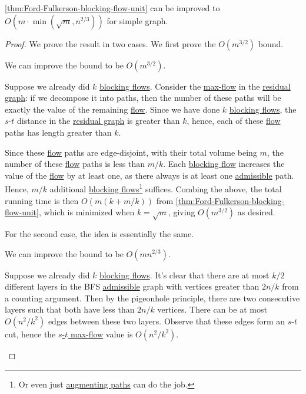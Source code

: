 \begin{corollary}\label{col:Ford-Fulkerson-blocking-flow-unit}
	\autoref{thm:Ford-Fulkerson-blocking-flow-unit} can be improved to \(O(m \cdot \min (\sqrt{m} , n^{2 / 3}))\) for simple graph.
\end{corollary}
\begin{proof}
	We prove the result in two cases. We first prove the \(O(m^{3 / 2})\) bound.

	\begin{claim}
		We can improve the bound to be \(O(m^{3 / 2})\).
	\end{claim}
	\begin{explanation}
		Suppose we already did \(k\) \hyperref[def:blocking-flow]{blocking flows}. Consider the \hyperref[prb:s-t-max-flow]{max-flow} in the \hyperref[def:residual-graph]{residual graph}: if we decompose it into paths, then the number of these paths will be exactly the value of the remaining \hyperref[def:flow]{flow}. Since we have done \(k\) \hyperref[def:blocking-flow]{blocking flows}, the \(s\)-\(t\) distance in the \hyperref[def:residual-graph]{residual graph} is greater than \(k\), hence, each of these \hyperref[def:flow]{flow} paths has length greater than \(k\).

		Since these \hyperref[def:flow]{flow} paths are edge-disjoint, with their total volume being \(m\), the number of these \hyperref[def:flow]{flow} paths is less than \(m / k\). Each \hyperref[def:blocking-flow]{blocking flow} increases the value of the \hyperref[def:flow]{flow} by at least one, as there always is at least one \hyperref[def:admissible]{admissible} path. Hence, \(m / k\) additional \hyperref[def:blocking-flow]{blocking flows}\footnote{Or even just \hyperref[def:augmenting-path]{augmenting paths} can do the job.} suffices. Combing the above, the total running time is then \(O(m (k + m / k))\) from \autoref{thm:Ford-Fulkerson-blocking-flow-unit}, which is minimized when \(k = \sqrt{m} \), giving \(O(m^{3 / 2})\) as desired.
	\end{explanation}

	For the second case, the idea is essentially the same.

	\begin{claim}
		We can improve the bound to be \(O(mn^{2 / 3})\).
	\end{claim}
	\begin{explanation}
		Suppose we already did \(k\) \hyperref[def:blocking-flow]{blocking flows}. It's clear that there are at most \(k / 2\) different layers in the BFS \hyperref[def:admissible]{admissible} graph with vertices greater than \(2n / k\) from a counting argument. Then by the pigeonhole principle, there are two consecutive layers such that both have less than \(2n / k\) vertices. There can be at most \(O(n^2 / k^2)\) edges between these two layers. Observe that these edges form an \(s\)-\(t\) cut, hence the \hyperref[prb:s-t-max-flow]{\(s\)-\(t\) max-flow} value is \(O(n^2 / k^2)\).


\end{explanation}
\end{proof}

